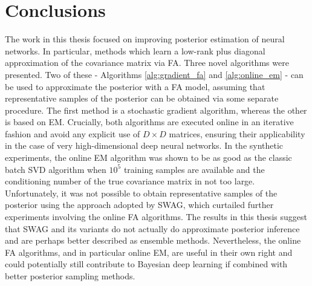 \documentclass[msc,deptreport.inf]{infthesis} %
\begin{document}
\chapter{Conclusions}\label{ch:conclusions}


%

The work in this thesis focused on improving posterior estimation of neural networks. In particular, methods which learn a low-rank plus diagonal approximation of the covariance matrix via FA. Three novel algorithms were presented. Two of these - Algorithms \ref{alg:gradient_fa} and \ref{alg:online_em} - can be used to approximate the posterior with a FA model, assuming that representative samples of the posterior can be obtained via some separate procedure. The first method is a stochastic gradient algorithm, whereas the other is based on EM. Crucially, both algorithms are executed online in an iterative fashion and avoid any explicit use of $D \times D$ matrices, ensuring their applicability in the case of very high-dimensional deep neural networks. In the synthetic experiments, the online EM algorithm was shown to be as good as the classic batch SVD algorithm when $10^5$ training samples are available and the conditioning number of the true covariance matrix in not too large. Unfortunately, it was not possible to obtain representative samples of the posterior using the approach adopted by SWAG, which curtailed further experiments involving the online FA algorithms. The results in this thesis suggest that SWAG and its variants do not actually do approximate posterior inference and are perhaps better described as ensemble methods. Nevertheless, the online FA algorithms, and in particular online EM, are useful in their own right and could potentially still contribute to Bayesian deep learning if combined with better posterior sampling methods. 
\end{document}
